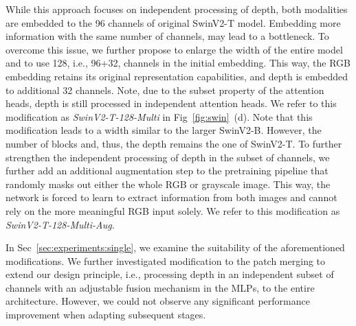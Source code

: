 \documentclass[conference]{IEEEtran}
\begin{document}
While this approach focuses on independent processing of depth, both modalities are embedded to the 96 channels of original SwinV2-T model.
Embedding more information with the same number of channels, may lead to a bottleneck.
To overcome this issue, we further propose to enlarge the width of the entire model and to use 128, i.e., 96+32, channels in the initial embedding.
This way, the RGB embedding retains its original representation capabilities, and depth is embedded to additional 32 channels.
Note, due to the subset property of the attention heads, depth is still processed in independent attention heads.
We refer to this modification as \emph{SwinV2-T-128-Multi} in Fig~\ref{fig:swin}~(d).
Note that this modification leads to a width similar to the larger SwinV2-B.
However, the number of blocks and, thus, the depth remains the one of SwinV2-T.
To further strengthen the independent processing of depth in the subset of channels, we further add an additional augmentation step to the pretraining pipeline that randomly masks out either the whole RGB or grayscale image.
This way, the network is forced to learn to extract information from both images and cannot rely on the more meaningful RGB input solely.
We refer to this modification as \emph{SwinV2-T-128-Multi-Aug}.



In Sec~\ref{sec:experiments:single}, we examine the suitability of the aforementioned modifications.
We further investigated modification to the patch merging to extend our design principle, i.e., processing depth in an independent subset of channels with an adjustable fusion mechanism in the MLPs, to the entire architecture. 
However, we could not observe any significant performance improvement when adapting subsequent stages.

 
\end{document}
